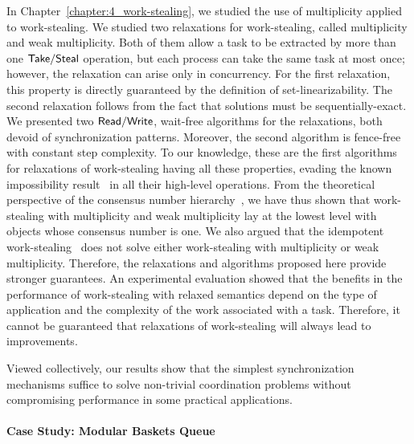 In Chapter~\ref{chapter:4_work-stealing}, we studied the use of multiplicity applied to work-stealing. We studied two relaxations for work-stealing, called multiplicity and weak multiplicity. Both of them allow a task to be extracted by more than one ${\sf Take}/{\sf Steal}$ operation, but each process can take the same task at most once; however, the relaxation can arise only in concurrency. For the first relaxation, this property is directly guaranteed by the definition of set-linearizability. The second relaxation follows from the fact that solutions must be sequentially-exact. We presented two ${\sf Read}/{\sf Write}$, wait-free algorithms for the relaxations, both devoid of \RAW synchronization patterns.
Moreover, the second algorithm is fence-free with constant step complexity. To our knowledge, these are the first algorithms for relaxations of work-stealing having all these properties, evading the known impossibility result~\cite{DBLP_conf_popl_AttiyaGHKMV11} in all their high-level operations. From the theoretical perspective of the consensus number hierarchy~\cite{DBLP_journals_toplas_Herlihy91}, we have thus shown that work-stealing with multiplicity and weak multiplicity lay at the lowest level with objects whose consensus number is one. We also argued that the idempotent work-stealing~\cite{maged.vechev.2009} does not solve either work-stealing with multiplicity or weak multiplicity. Therefore, the relaxations and algorithms proposed here provide stronger guarantees. An experimental evaluation showed that the benefits in the performance of work-stealing with relaxed semantics depend on the type of application and the complexity of the work associated with a task. Therefore, it cannot be guaranteed that relaxations of work-stealing will always lead to improvements.

Viewed collectively, our results show that the simplest synchronization mechanisms suffice to solve non-trivial coordination problems without compromising performance in some practical applications.

\paragraph{Case Study: Modular Baskets Queue}

